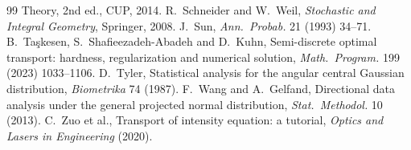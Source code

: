\documentclass[11pt]{article}
\theoremstyle{definition}
\begin{document}
\begin{thebibliography}{99}
{Theory}, 2nd ed., CUP, 2014.
 R.~Schneider and W.~Weil, \emph{Stochastic and Integral
Geometry}, Springer, 2008.
 J.~Sun, \emph{Ann.\ Probab.} 21 (1993) 34--71.
 B.~Ta\c{s}kesen, S.~Shafieezadeh-Abadeh and D.~Kuhn,
Semi-discrete optimal transport: hardness, regularization and numerical
solution, \emph{Math.\ Program.} 199 (2023) 1033--1106.
 D.~Tyler, Statistical analysis for the angular central Gaussian
distribution, \emph{Biometrika} 74 (1987).
 F.~Wang and A.~Gelfand, Directional data analysis under
the general projected normal distribution, \emph{Stat.\ Methodol.} 10 (2013).
 C.~Zuo et al., Transport of intensity equation: a tutorial,
\emph{Optics and Lasers in Engineering} (2020).
\end{thebibliography}
\end{document}
